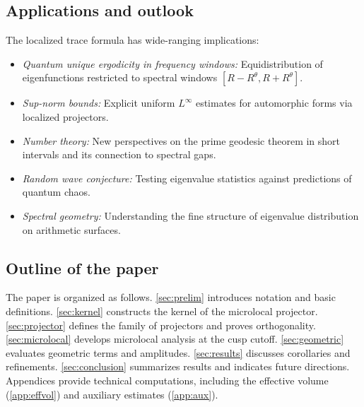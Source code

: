 \subsection{Applications and outlook}\label{subsec:applications}

The localized trace formula has wide-ranging implications:

\begin{itemize}
  \item \emph{Quantum unique ergodicity in frequency windows:} Equidistribution of eigenfunctions restricted to spectral windows $[R-R^\theta,R+R^\theta]$.
  \item \emph{Sup-norm bounds:} Explicit uniform $L^\infty$ estimates for automorphic forms via localized projectors.
  \item \emph{Number theory:} New perspectives on the prime geodesic theorem in short intervals and its connection to spectral gaps.
  \item \emph{Random wave conjecture:} Testing eigenvalue statistics against predictions of quantum chaos.
  \item \emph{Spectral geometry:} Understanding the fine structure of eigenvalue distribution on arithmetic surfaces.
\end{itemize}

\subsection{Outline of the paper}\label{subsec:outline}

The paper is organized as follows.  
\cref{sec:prelim} introduces notation and basic definitions.  
\cref{sec:kernel} constructs the kernel of the microlocal projector.  
\cref{sec:projector} defines the family of projectors and proves orthogonality.  
\cref{sec:microlocal} develops microlocal analysis at the cusp cutoff.  
\cref{sec:geometric} evaluates geometric terms and amplitudes.  
\cref{sec:results} discusses corollaries and refinements.  
\cref{sec:conclusion} summarizes results and indicates future directions.  
Appendices provide technical computations, including the effective volume (\cref{app:effvol}) and auxiliary estimates (\cref{app:aux}).
